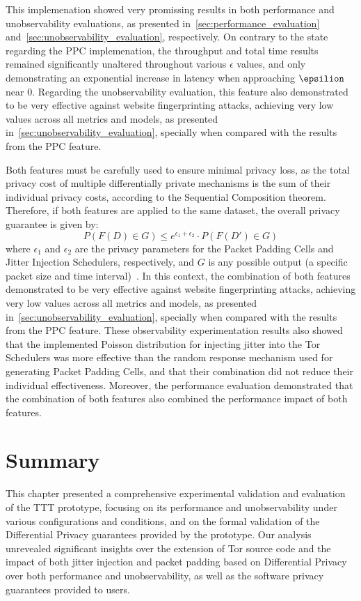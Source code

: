 This implemenation showed very promissing results in both performance and unobservability evaluations, as presented in~\autoref{sec:performance_evaluation} and~\autoref{sec:unobservability_evaluation}, respectively. On contrary to the state regarding the PPC implemenation, the throughput and total time results remained significantly unaltered throughout various $\epsilon$ values, and only demonstrating an exponential increase in latency when approaching $\epsilion$ near 0. Regarding the unobservability evaluation, this feature also demonstrated to be very effective against website fingerprinting attacks, achieving very low values across all metrics and models, as presented in~\autoref{sec:unobservability_evaluation}, specially when compared with the results from the PPC feature.


Both features must be carefully used to ensure minimal privacy loss, as the total privacy cost of multiple differentially private mechanisms is the sum of their individual privacy costs, according to the Sequential Composition theorem. Therefore, if both features are applied to the same dataset, the overall privacy guarantee is given by:
\[P(F(D) \in G) \leq e^{\epsilon_1 + \epsilon_2} \cdot P(F(D') \in G)\]
where $\epsilon_1$ and $\epsilon_2$ are the privacy parameters for the Packet Padding Cells and Jitter Injection Schedulers, respectively, and $G$ is any possible output (a specific packet size and time interval)~\cite{DP_Book, AlgFoundationsDP}.
In this context, the combination of both features demonstrated to be very effective against website fingerprinting attacks, achieving very low values across all metrics and models, as presented in~\autoref{sec:unobservability_evaluation}, specially when compared with the results from the PPC feature.
These observability experimentation results also showed that the implemented Poisson distribution for injecting jitter into the Tor Schedulers was more effective than the random response mechanism used for generating Packet Padding Cells, and that their combination did not reduce their individual effectiveness.
Moreover, the performance evaluation demonstrated that the combination of both features also combined the performance impact of both features. 

\section{Summary}\label{sec:validation_summary} %

This chapter presented a comprehensive experimental validation and evaluation of the TTT prototype, focusing on its performance and unobservability under various configurations and conditions, and on the formal validation of the Differential Privacy guarantees provided by the prototype. Our analysis unrevealed significant insights over the extension of Tor source code and the impact of both jitter injection and packet padding based on Differential Privacy over both performance and unobservability, as well as the software privacy guarantees provided to users. 

